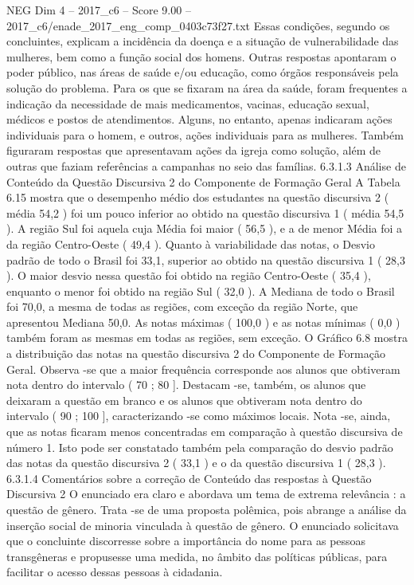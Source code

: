 \begin{textsample}{NEG Dim 4 – 2017\_c6 – Score 9.00 – 2017\_c6/enade\_2017\_eng\_comp\_0403c73f27.txt}
Essas condições, segundo os concluintes, explicam a incidência da doença e a situação de vulnerabilidade das mulheres, bem como a função social dos homens.
Outras respostas apontaram o poder público, nas áreas de saúde e/ou educação, como órgãos responsáveis pela solução do problema.
Para os que se fixaram na área da saúde, foram frequentes a indicação da necessidade de mais medicamentos, vacinas, educação sexual, médicos e postos de atendimentos.
Alguns, no entanto, apenas indicaram ações individuais para o homem, e outros, ações individuais para as mulheres.
Também figuraram respostas que apresentavam ações da igreja como solução, além de outras que faziam referências a campanhas no seio das famílias. 6.3.1.3 Análise de Conteúdo da Questão Discursiva 2 do Componente de Formação Geral A Tabela 6.15 mostra que o desempenho médio dos estudantes na questão discursiva 2 ( média 54,2 ) foi um pouco inferior ao obtido na questão discursiva 1 ( média 54,5 ).
A região Sul foi aquela cuja Média foi maior ( 56,5 ), e a de menor Média foi a da região Centro-Oeste ( 49,4 ).
Quanto à variabilidade das notas, o Desvio padrão de todo o Brasil foi 33,1, superior ao obtido na questão discursiva 1 ( 28,3 ).
O maior desvio nessa questão foi obtido na região Centro-Oeste ( 35,4 ), enquanto o menor foi obtido na região Sul ( 32,0 ).
A Mediana de todo o Brasil foi 70,0, a mesma de todas as regiões, com exceção da região Norte, que apresentou Mediana 50,0.
As notas máximas ( 100,0 ) e as notas mínimas ( 0,0 ) também foram as mesmas em todas as regiões, sem exceção.
O Gráfico 6.8 mostra a distribuição das notas na questão discursiva 2 do Componente de Formação Geral.
Observa -se que a maior frequência corresponde aos alunos que obtiveram nota dentro do intervalo ( 70 ; 80 ].
Destacam -se, também, os alunos que deixaram a questão em branco e os alunos que obtiveram nota dentro do intervalo ( 90 ; 100 ], caracterizando -se como máximos locais.
Nota -se, ainda, que as notas ficaram menos concentradas em comparação à questão discursiva de número 1.
Isto pode ser constatado também pela comparação do desvio padrão das notas da questão discursiva 2 ( 33,1 ) e o da questão discursiva 1 ( 28,3 ). 6.3.1.4 Comentários sobre a correção de Conteúdo das respostas à Questão Discursiva 2 O enunciado era claro e abordava um tema de extrema relevância : a questão de gênero.
Trata -se de uma proposta polêmica, pois abrange a análise da inserção social de minoria vinculada à questão de gênero.
O enunciado solicitava que o concluinte discorresse sobre a importância do nome para as pessoas transgêneras e propusesse uma medida, no âmbito das políticas públicas, para facilitar o acesso dessas pessoas à cidadania.

\end{textsample}
